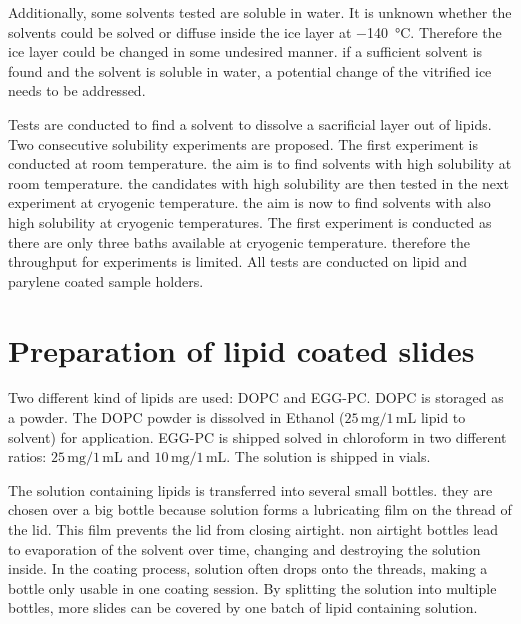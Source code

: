 Additionally, some solvents tested are soluble in water. It is unknown whether the solvents could be solved or diffuse inside the ice layer at \SI{-140}{\degreeCelsius}. Therefore the ice layer could be changed in some undesired manner. if a sufficient solvent is found and the solvent is soluble in water, a potential change of the vitrified ice needs to be addressed.

Tests are conducted to find a solvent to dissolve a sacrificial layer out of lipids. Two consecutive solubility experiments are proposed. The first experiment is conducted at room temperature. the aim is to find solvents with high solubility at room temperature. the candidates with high solubility are then tested in the next experiment at cryogenic temperature. the aim is now to find solvents with also high solubility at cryogenic temperatures. The first experiment is conducted as there are only three baths available at cryogenic temperature. therefore the throughput for experiments is limited. All tests are conducted on lipid and parylene coated sample holders.

\section{Preparation of lipid coated slides}

Two different kind of lipids are used: DOPC and EGG-PC. DOPC is storaged as a powder. The DOPC powder is dissolved in Ethanol ($25\,\si{\milli\gram}/1\,\si{\milli\liter}$ lipid to solvent) for application. EGG-PC is shipped solved in chloroform in two different ratios: $25\,\si{\milli\gram}/1\,\si{\milli\liter}$ and $10\,\si{\milli\gram}/1\,\si{\milli\liter}$. The solution is shipped in vials.

The solution containing lipids is transferred into several small bottles. they are chosen over a big bottle because solution forms a lubricating film on the thread of the lid. This film prevents the lid from closing airtight. non airtight bottles lead to evaporation of the solvent over time, changing and destroying the solution inside. In the coating process, solution often drops onto the threads, making a bottle only usable in one coating session. By splitting the solution into multiple bottles, more slides can be covered by one batch of lipid containing solution.


